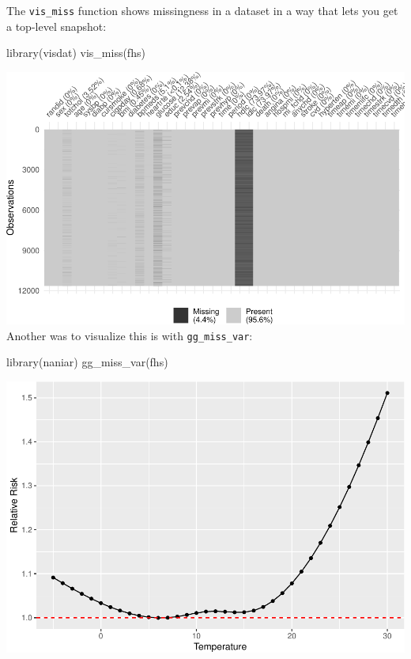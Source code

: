 \documentclass[
]{book}
\newenvironment{Shaded}{\begin{snugshade}}{\end{snugshade}}
\newcommand{\FunctionTok}[1]{\textcolor[rgb]{0.00,0.00,0.00}{#1}}
\newcommand{\NormalTok}[1]{#1}
\begin{document}
The \texttt{vis\_miss} function shows missingness in a dataset in a way that lets you
get a top-level snapshot:

\begin{Shaded}
\begin{Highlighting}[]
\FunctionTok{library}\NormalTok{(visdat)}
\FunctionTok{vis\_miss}\NormalTok{(fhs)}
\end{Highlighting}
\end{Shaded}

\includegraphics{adv_epi_analysis_files/figure-latex/unnamed-chunk-74-1.pdf}
Another was to visualize this is with \texttt{gg\_miss\_var}:

\begin{Shaded}
\begin{Highlighting}[]
\FunctionTok{library}\NormalTok{(naniar)}
\FunctionTok{gg\_miss\_var}\NormalTok{(fhs)}
\end{Highlighting}
\end{Shaded}

\includegraphics{adv_epi_analysis_files/figure-latex/unnamed-chunk-75-1.pdf}
\end{document}
